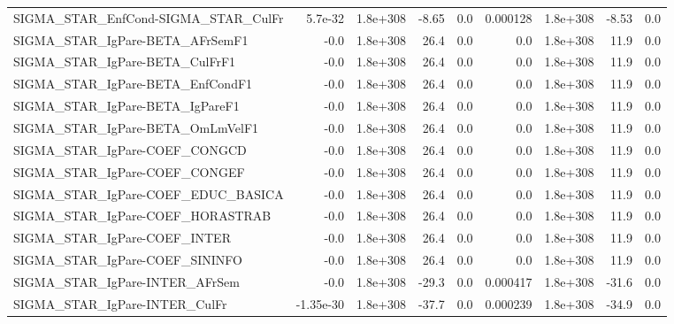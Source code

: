 \begin{tabular}{lrrrrrrrr}
SIGMA\_STAR\_EnfCond-SIGMA\_STAR\_CulFr   &     5.7e-32 &     1.8e+308 &   -8.65 &      0.0 &   0.000128 &    1.8e+308 &        -8.53 &           0.0 \\
SIGMA\_STAR\_IgPare-BETA\_AFrSemF1       &        -0.0 &     1.8e+308 &    26.4 &      0.0 &        0.0 &    1.8e+308 &         11.9 &           0.0 \\
SIGMA\_STAR\_IgPare-BETA\_CulFrF1        &        -0.0 &     1.8e+308 &    26.4 &      0.0 &        0.0 &    1.8e+308 &         11.9 &           0.0 \\
SIGMA\_STAR\_IgPare-BETA\_EnfCondF1      &        -0.0 &     1.8e+308 &    26.4 &      0.0 &        0.0 &    1.8e+308 &         11.9 &           0.0 \\
SIGMA\_STAR\_IgPare-BETA\_IgPareF1       &        -0.0 &     1.8e+308 &    26.4 &      0.0 &        0.0 &    1.8e+308 &         11.9 &           0.0 \\
SIGMA\_STAR\_IgPare-BETA\_OmLmVelF1      &        -0.0 &     1.8e+308 &    26.4 &      0.0 &        0.0 &    1.8e+308 &         11.9 &           0.0 \\
SIGMA\_STAR\_IgPare-COEF\_CONGCD         &        -0.0 &     1.8e+308 &    26.4 &      0.0 &        0.0 &    1.8e+308 &         11.9 &           0.0 \\
SIGMA\_STAR\_IgPare-COEF\_CONGEF         &        -0.0 &     1.8e+308 &    26.4 &      0.0 &        0.0 &    1.8e+308 &         11.9 &           0.0 \\
SIGMA\_STAR\_IgPare-COEF\_EDUC\_BASICA    &        -0.0 &     1.8e+308 &    26.4 &      0.0 &        0.0 &    1.8e+308 &         11.9 &           0.0 \\
SIGMA\_STAR\_IgPare-COEF\_HORASTRAB      &        -0.0 &     1.8e+308 &    26.4 &      0.0 &        0.0 &    1.8e+308 &         11.9 &           0.0 \\
SIGMA\_STAR\_IgPare-COEF\_INTER          &        -0.0 &     1.8e+308 &    26.4 &      0.0 &        0.0 &    1.8e+308 &         11.9 &           0.0 \\
SIGMA\_STAR\_IgPare-COEF\_SININFO        &        -0.0 &     1.8e+308 &    26.4 &      0.0 &        0.0 &    1.8e+308 &         11.9 &           0.0 \\
SIGMA\_STAR\_IgPare-INTER\_AFrSem        &        -0.0 &     1.8e+308 &   -29.3 &      0.0 &   0.000417 &    1.8e+308 &        -31.6 &           0.0 \\
SIGMA\_STAR\_IgPare-INTER\_CulFr         &   -1.35e-30 &     1.8e+308 &   -37.7 &      0.0 &   0.000239 &    1.8e+308 &        -34.9 &           0.0 \\

\end{tabular}
